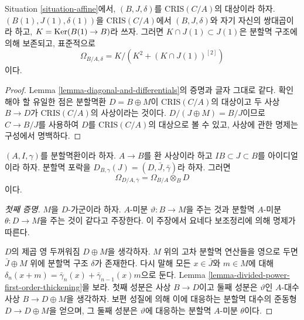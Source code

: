 \begin{lemma}
\label{lemma-diagonal-and-differentials-affine-site}
Situation \ref{situation-affine}에서, $(B, J, \delta)$를
$\text{CRIS}(C/A)$의 대상이라 하자. $(B(1), J(1), \delta(1))$을
$\text{CRIS}(C/A)$에서 $(B, J, \delta)$와 자기 자신의 쌍대곱이라 하고,
$K = \mathop{\mathrm{Ker}}(B(1) \to B)$라 쓰자. 그러면
$K \cap J(1) \subset J(1)$은 분할멱 구조에 의해 보존되고,
표준적으로
$$
\Omega_{B/A, \delta} = K/ \left(K^2 + (K \cap J(1))^{[2]}\right)
$$
이다.
\end{lemma}

\begin{proof}
Lemma \ref{lemma-diagonal-and-differentials}의 증명과 글자 그대로 같다.
확인해야 할 유일한 점은 분할멱환 $D = B \oplus M$이
$\text{CRIS}(C/A)$의 대상이고 두 사상 $B \to D$가
$\text{CRIS}(C/A)$의 사상이라는 것이다.
$D/(J \oplus M) = B/J$이므로 $C \to B/J$를 사용하여 $D$를
$\text{CRIS}(C/A)$의 대상으로 볼 수 있고, 사상에 관한 명제는
구성에서 명백하다.
\end{proof}

\begin{lemma}
\label{lemma-module-differentials-divided-power-envelope}
$(A, I, \gamma)$를 분할멱환이라 하자. $A \to B$를 환 사상이라 하고
$IB \subset J \subset B$를 아이디얼이라 하자. 분할멱 포락을
$D_{B, \gamma}(J) = (D, \bar J, \bar \gamma)$라 하자. 그러면
$$
\Omega_{D/A, \bar\gamma} = \Omega_{B/A} \otimes_B D
$$
이다.
\end{lemma}

\begin{proof}[첫째 증명]
$M$을 $D$-가군이라 하자. $A$-미분 $\vartheta : B \to M$을 주는 것과
분할멱 $A$-미분 $\theta : D \to M$을 주는 것이 같다고 주장한다.
이 주장에서 요네다 보조정리에 의해 명제가 따른다.

\medskip\noindent
$D$의 제곱 영 두꺼워짐 $D \oplus M$을 생각하자. $M$ 위의 고차
분할멱 연산들을 영으로 두면 $\bar J \oplus M$ 위에 분할멱 구조
$\delta$가 존재한다. 다시 말해 모든 $x \in \bar J$와 $m \in M$에 대해
$\delta_n(x + m) = \bar\gamma_n(x) + \bar\gamma_{n - 1}(x)m$으로 둔다.
Lemma \ref{lemma-divided-power-first-order-thickening}을 보라.
첫째 성분은 사상 $B \to D$이고 둘째 성분은 $\vartheta$인
$A$-대수 사상 $B \to D \oplus M$을 생각하자. 보편 성질에 의해
이에 대응하는 분할멱 대수의 준동형 $D \to D \oplus M$을 얻으며,
그 둘째 성분은 $\vartheta$에 대응하는 분할멱 $A$-미분 $\theta$이다.
\end{proof}

